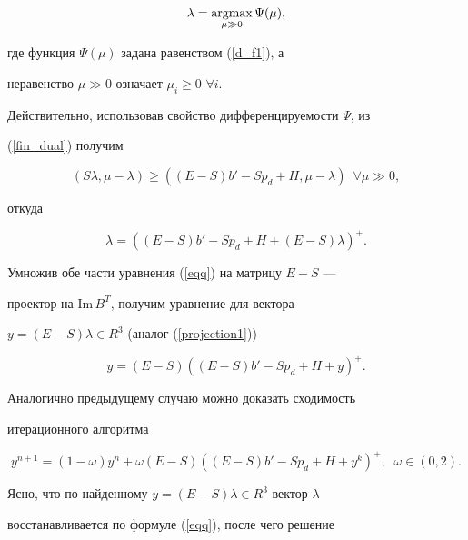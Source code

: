 \begin{equation}\label{fin_dual}


\lambda =\argmax\limits_{\mu\gg 0}\Psi(\mu),


\end{equation}


где функция $\Psi(\mu)$ задана равенством (\ref{d_f1}), а


неравенство $\mu\gg 0$ означает $\mu_{i}\geq 0$ $\forall i$.


Действительно, использовав свойство дифференцируемости $\Psi$, из


(\ref{fin_dual}) получим


$$


(S\lambda, \mu - \lambda)\geq


((E-S)b'-Sp_d+H,\mu-\lambda) \ \; \forall \mu\gg 0,


$$


откуда


\begin{equation}\label{eqq}


\lambda=((E-S)b'-Sp_d+H+(E-S)\lambda)^{+}.


\end{equation}


Умножив обе части уравнения (\ref{eqq}) на матрицу $E-S$ ---


проектор на $\mathrm{Im}\, B^T$, получим уравнение для вектора


$y=(E-S)\lambda \in R^3$ (аналог (\ref{projection1}))


$$




y=(E-S)((E-S)b'-Sp_d+H+y)^{+}.




$$


Аналогично предыдущему случаю можно доказать сходимость


итерационного алгоритма


\begin{equation}\label{iter1}


y^{n+1}=(1-\omega)y^n+\omega(E-S)((E-S)b'-Sp_d+H+y^k)^{+},


\;\;\omega\in (0,2).


\end{equation}


Ясно, что по найденному $y=(E-S)\lambda \in R^3$ вектор $\lambda$


восстанавливается по формуле (\ref{eqq}), после чего решение


